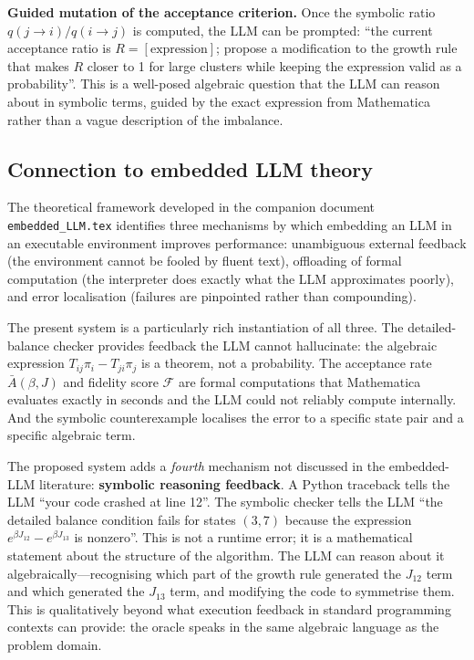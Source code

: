 \documentclass[10.5pt]{article}
\begin{document}
\textbf{Guided mutation of the acceptance criterion.}  Once the symbolic
ratio $q(j \to i)/q(i \to j)$ is computed, the LLM can be prompted:
``the current acceptance ratio is $R = [\text{expression}]$; propose a
modification to the growth rule that makes $R$ closer to 1 for large
clusters while keeping the expression valid as a probability''.  This
is a well-posed algebraic question that the LLM can reason about in
symbolic terms, guided by the exact expression from Mathematica rather
than a vague description of the imbalance.

\subsection*{Connection to embedded LLM theory}

The theoretical framework developed in the companion document
\texttt{embedded\_LLM.tex} \cite{gao2023pal,yao2023react,shinn2023reflexion}
identifies three mechanisms by which embedding an LLM in an executable
environment improves performance: unambiguous external feedback (the
environment cannot be fooled by fluent text), offloading of formal
computation (the interpreter does exactly what the LLM approximates
poorly), and error localisation (failures are pinpointed rather than
compounding).

The present system is a particularly rich instantiation of all three.
The detailed-balance checker provides feedback the LLM cannot
hallucinate: the algebraic expression $T_{ij}\pi_i - T_{ji}\pi_j$ is a
theorem, not a probability.  The acceptance rate $\bar{A}(\beta,J)$ and
fidelity score $\mathcal{F}$ are formal computations that Mathematica
evaluates exactly in seconds and the LLM could not reliably compute
internally.  And the symbolic counterexample localises the error to a
specific state pair and a specific algebraic term.

The proposed system adds a \emph{fourth} mechanism not discussed in the
embedded-LLM literature: \textbf{symbolic reasoning feedback}.  A Python
traceback tells the LLM ``your code crashed at line 12''.  The symbolic
checker tells the LLM ``the detailed balance condition fails for states
$(3, 7)$ because the expression $e^{\beta J_{12}} - e^{\beta J_{13}}$ is
nonzero''.  This is not a runtime error; it is a mathematical statement
about the structure of the algorithm.  The LLM can reason about it
algebraically---recognising which part of the growth rule generated the
$J_{12}$ term and which generated the $J_{13}$ term, and modifying the
code to symmetrise them.  This is qualitatively beyond what execution
feedback in standard programming contexts can provide: the oracle speaks
in the same algebraic language as the problem domain.
\end{document}
